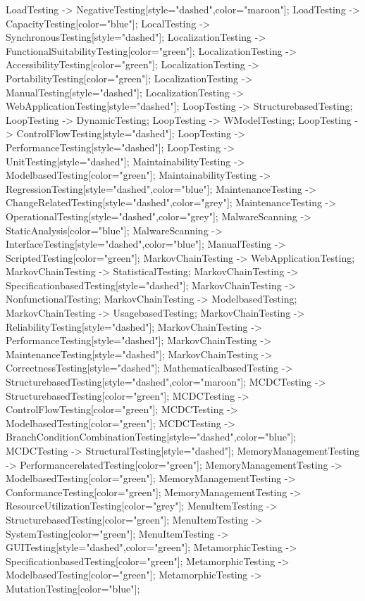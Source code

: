 \documentclass{article}
\begin{document}
{LoadTesting -> NegativeTesting[style="dashed",color="maroon"];
LoadTesting -> CapacityTesting[color="blue"];
LocalTesting -> SynchronousTesting[style="dashed"];
LocalizationTesting -> FunctionalSuitabilityTesting[color="green"];
LocalizationTesting -> AccessibilityTesting[color="green"];
LocalizationTesting -> PortabilityTesting[color="green"];
LocalizationTesting -> ManualTesting[style="dashed"];
LocalizationTesting -> WebApplicationTesting[style="dashed"];
LoopTesting -> StructurebasedTesting;
LoopTesting -> DynamicTesting;
LoopTesting -> WModelTesting;
LoopTesting -> ControlFlowTesting[style="dashed"];
LoopTesting -> PerformanceTesting[style="dashed"];
LoopTesting -> UnitTesting[style="dashed"];
MaintainabilityTesting -> ModelbasedTesting[color="green"];
MaintainabilityTesting -> RegressionTesting[style="dashed",color="blue"];
MaintenanceTesting -> ChangeRelatedTesting[style="dashed",color="grey"];
MaintenanceTesting -> OperationalTesting[style="dashed",color="grey"];
MalwareScanning -> StaticAnalysis[color="blue"];
MalwareScanning -> InterfaceTesting[style="dashed",color="blue"];
ManualTesting -> ScriptedTesting[color="green"];
MarkovChainTesting -> WebApplicationTesting;
MarkovChainTesting -> StatisticalTesting;
MarkovChainTesting -> SpecificationbasedTesting[style="dashed"];
MarkovChainTesting -> NonfunctionalTesting;
MarkovChainTesting -> ModelbasedTesting;
MarkovChainTesting -> UsagebasedTesting;
MarkovChainTesting -> ReliabilityTesting[style="dashed"];
MarkovChainTesting -> PerformanceTesting[style="dashed"];
MarkovChainTesting -> MaintenanceTesting[style="dashed"];
MarkovChainTesting -> CorrectnessTesting[style="dashed"];
MathematicalbasedTesting -> StructurebasedTesting[style="dashed",color="maroon"];
MCDCTesting -> StructurebasedTesting[color="green"];
MCDCTesting -> ControlFlowTesting[color="green"];
MCDCTesting -> ModelbasedTesting[color="green"];
MCDCTesting -> BranchConditionCombinationTesting[style="dashed",color="blue"];
MCDCTesting -> StructuralTesting[style="dashed"];
MemoryManagementTesting -> PerformancerelatedTesting[color="green"];
MemoryManagementTesting -> ModelbasedTesting[color="green"];
MemoryManagementTesting -> ConformanceTesting[color="green"];
MemoryManagementTesting -> ResourceUtilizationTesting[color="grey"];
MenuItemTesting -> StructurebasedTesting[color="green"];
MenuItemTesting -> SystemTesting[color="green"];
MenuItemTesting -> GUITesting[style="dashed",color="green"];
MetamorphicTesting -> SpecificationbasedTesting[color="green"];
MetamorphicTesting -> ModelbasedTesting[color="green"];
MetamorphicTesting -> MutationTesting[color="blue"];
}
\end{document}
